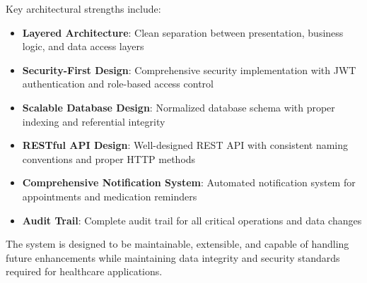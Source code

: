 \documentclass[12pt,a4paper]{article}
\begin{document}
Key architectural strengths include:
\begin{itemize}
\item \textbf{Layered Architecture}: Clean separation between presentation, business logic, and data access layers
\item \textbf{Security-First Design}: Comprehensive security implementation with JWT authentication and role-based access control
\item \textbf{Scalable Database Design}: Normalized database schema with proper indexing and referential integrity
\item \textbf{RESTful API Design}: Well-designed REST API with consistent naming conventions and proper HTTP methods
\item \textbf{Comprehensive Notification System}: Automated notification system for appointments and medication reminders
\item \textbf{Audit Trail}: Complete audit trail for all critical operations and data changes
\end{itemize}

The system is designed to be maintainable, extensible, and capable of handling future enhancements while maintaining data integrity and security standards required for healthcare applications.
\end{document}
